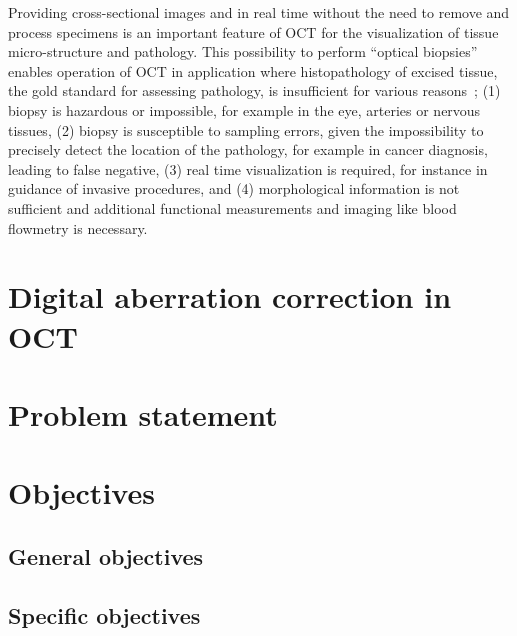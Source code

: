 Providing cross-sectional images \insi and in real time without the need to remove and process specimens is an important feature of OCT for the visualization of tissue micro-structure and pathology. This possibility to perform ``optical biopsies'' enables operation of OCT in application where histopathology of excised tissue, the gold standard for assessing pathology, is insufficient for various reasons~\cite{}; (1) biopsy is hazardous or impossible, for example in the eye, arteries or nervous tissues, (2) biopsy is susceptible to sampling errors, given the impossibility to precisely detect the location of the pathology, for example in cancer diagnosis, leading to false negative, (3) real time visualization is required, for instance in guidance of invasive procedures, and (4) morphological information is not sufficient and additional functional measurements and imaging like blood flowmetry is necessary.


\section{Digital aberration correction in OCT}

\section{Problem statement}

\section{Objectives}

\subsection{General objectives}

\subsection{Specific objectives}